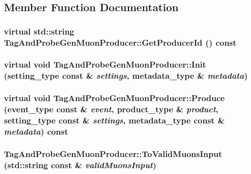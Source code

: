 \subsection{Member Function Documentation}
\hypertarget{classTagAndProbeGenMuonProducer_a4f6033fb83656a1f34de9c1bb8b5135e}{
\subsubsection[{GetProducerId}]{\setlength{\rightskip}{0pt plus 5cm}virtual std::string TagAndProbeGenMuonProducer::GetProducerId () const}}
\label{classTagAndProbeGenMuonProducer_a4f6033fb83656a1f34de9c1bb8b5135e}
\hypertarget{classTagAndProbeGenMuonProducer_a927f39dbd30f06d1befb65c49ed26525}{
\subsubsection[{Init}]{\setlength{\rightskip}{0pt plus 5cm}virtual void TagAndProbeGenMuonProducer::Init (setting\_\-type const \& {\em settings}, \/  metadata\_\-type \& {\em metadata})}}
\label{classTagAndProbeGenMuonProducer_a927f39dbd30f06d1befb65c49ed26525}
\hypertarget{classTagAndProbeGenMuonProducer_a4517f17b5b9cbabb84dd547f2a43b07f}{
\subsubsection[{Produce}]{\setlength{\rightskip}{0pt plus 5cm}virtual void TagAndProbeGenMuonProducer::Produce (event\_\-type const \& {\em event}, \/  product\_\-type \& {\em product}, \/  setting\_\-type const \& {\em settings}, \/  metadata\_\-type const \& {\em metadata}) const}}
\label{classTagAndProbeGenMuonProducer_a4517f17b5b9cbabb84dd547f2a43b07f}
\hypertarget{classTagAndProbeGenMuonProducer_a5d38cd666b0311d82decbd85f9600044}{
\subsubsection[{ToValidMuonsInput}]{ TagAndProbeGenMuonProducer::ToValidMuonsInput (std::string const \& {\em validMuonsInput})}}
